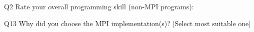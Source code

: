 \begin{description}%
\item{Q2} Rate your overall programming skill (non-MPI programs):%
\item{Q13} Why did you choose the MPI implementation(s)? [Select most suitable one]%
\end{description}%
